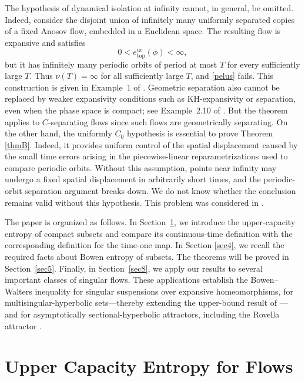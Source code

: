 \documentclass[11pt,reqno]{amsart}
\theoremstyle{definition}
\theoremstyle{remark}
\newcommand{\hE}{e^{\mathrm{uc}}_{\mathrm{top}}}
\begin{document}
The hypothesis of dynamical isolation at infinity cannot, in general,
be omitted. Indeed, consider the disjoint union of infinitely many
uniformly separated copies of a fixed Anosov flow, embedded in a
Euclidean space. The resulting flow is expansive and satisfies
\[
0<\hE(\phi)<\infty,
\]
but it has infinitely many periodic orbits of period at most $T$ for
every sufficiently large $T$. Thus $\nu(T)=\infty$ for all sufficiently
large $T$, and \eqref{pelus} fails. This construction is given in
Example~1 of \cite{ym1}.
Geometric separation also cannot be replaced by weaker expansivity
conditions such as KH-expansivity or separation, even when the phase
space is compact; see Example~2.10 of \cite{a}. But the
theorem applies to $C$-separating flows \cite{h} since such flows are geometrically separating.
On the other hand, the uniformly $C_0$ hypothesis is essential to prove Theorem \ref{thmB}. Indeed,
it provides uniform control of the spatial displacement caused by the
small time errors arising in the piecewise-linear reparametrizations
used to compare periodic orbits. Without this assumption, points near
infinity may undergo a fixed spatial displacement in arbitrarily short
times, and the periodic-orbit separation argument breaks down. We do
not know whether the conclusion remains valid without this hypothesis. This problem was considered in \cite{ym1}.

The paper is organized as follows.  In Section~\ref{sec2}, we introduce the upper-capacity entropy of compact subsets and compare its continuous-time
definition with the corresponding definition for the time-one map.  In Section \ref{sec4}, we recall the required facts about Bowen entropy of
subsets.  The theorems will be proved in
Section~\ref{sec5}.  Finally, in Section~\ref{sec8}, we apply our results to several
important classes of singular flows. These applications establish the
Bowen--Walters inequality for singular suspensions over expansive
homeomorphisms, for multisingular-hyperbolic sets---thereby extending
the upper-bound result of \cite{pyyz}---and for asymptotically
sectional-hyperbolic attractors, including the Rovella attractor \cite{r}.


















\section{Upper Capacity Entropy for Flows}
\label{sec2}
\end{document}
